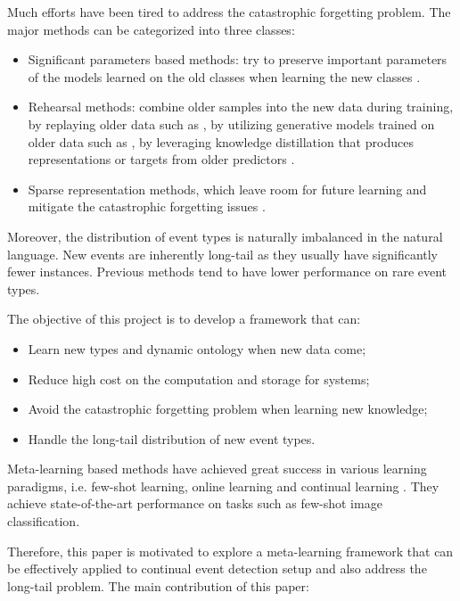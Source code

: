Much efforts have been tired to address the catastrophic forgetting problem. The major methods can be categorized into three classes: 
\begin{itemize}[noitemsep]
  \item Significant parameters based methods: try to preserve important parameters of the models learned on the old classes when learning the new classes \citep{kirkpatrick2017overcoming, aljundi2018memory}.
  \item Rehearsal methods: combine older samples into the new data during training, by replaying older data such as \citep{rebuffi2017icarl, hou2019learning}, by utilizing generative models trained on older data such as          \citep{shin2017continual}, by leveraging knowledge distillation that produces representations or targets from older predictors \citep{li2017learning, cao2020incremental}.
  \item Sparse representation methods, which leave room for future learning and mitigate the catastrophic forgetting issues \citep{liu2019utility, aljundi2018selfless}.
\end{itemize}


Moreover, the distribution of event types is naturally imbalanced in the natural language.  New events are inherently long-tail \citep{yu2021lifelong} as they usually have significantly fewer instances. Previous methods \citep{nguyen2016two, cao2020incremental} tend to have lower performance on rare event types.  

The objective of this project is to develop a framework that can:
\begin{itemize}[noitemsep]
\item Learn new types and dynamic ontology when new data come;
 \item Reduce high cost on the computation and storage for systems;
 \item Avoid the catastrophic forgetting problem when learning new knowledge;
\item Handle the long-tail distribution of new event types.
\end{itemize}

Meta-learning based methods have achieved great success in various learning paradigms, i.e. few-shot learning, online learning and continual learning \citep{harrison2019continuous, javed2019meta}. They achieve state-of-the-art performance on tasks such as few-shot image classification. 



Therefore, this paper is motivated to explore a meta-learning framework that can be effectively applied to continual event detection setup and also address the long-tail problem.  The main contribution of this paper:


